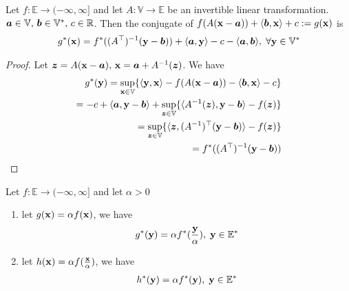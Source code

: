 \documentclass[11pt]{article}
\begin{document}
\begin{theorem}
    Let $f: \mathbb{E} \to (-\infty,\infty]$ and let $A: \mathbb{V} \to \mathbb{E}$ be an invertible 
    linear transformation. ${\bm{a}} \in \mathbb{V},\, {\bm{b}} \in \mathbb{V}^{*},\, c\in \mathbb{R}$. 
    Then the conjugate of $f(A({\mathbf{x}} - {\bm{a}})) + \langle {\bm{b}}, {\mathbf{x}} \rangle + c := g({\mathbf{x}})$ is 
    \begin{align*}
        g^{*}({\mathbf{x}}) = f^{*}((A^{\top})^{-1}({\mathbf{y}} - {\bm{b}})) + \langle {\bm{a}}, {\mathbf{y}} \rangle - c - \langle {\bm{a}}, {\bm{b}} \rangle,
        \; \forall {\mathbf{y}} \in \mathbb{V}^{*}
    \end{align*}
\end{theorem}
\begin{proof}
    Let ${\bm{z}} = A({\mathbf{x}} - {\bm{a}}), \, {\mathbf{x}} = {\bm{a}} + A^{-1}({\bm{z}})$. We have 
    \begin{align*}
        g^{*}({\mathbf{y}}) = \sup_{{\mathbf{x}} \in \mathbb{V}}\{ \langle {\mathbf{y}},{\mathbf{x}} \rangle - f(A({\mathbf{x}} - {\bm{a}})) - 
        \langle {\bm{b}}, {\mathbf{x}} \rangle - c \} \\
        = -c + \langle {\bm{a}}, {\mathbf{y}} - {\bm{b}} \rangle + 
            \sup_{{\bm{z}} \in \mathbb{V}}\{ \langle A^{-1}({\bm{z}}), {\mathbf{y}} - {\bm{b}} \rangle - f({\bm{z}}) \}\\
        = \sup_{{\bm{z}} \in \mathbb{V}}\{ \langle {\bm{z}}, (A^{-1})^{\top}({\mathbf{y}} - {\bm{b}}) \rangle - f({\bm{z}}) \}\\
        = f^{*}((A^{\top})^{-1}({\mathbf{y}} - {\bm{b}}))
    \end{align*}
\end{proof}

\begin{theorem}
    Let $f: \mathbb{E} \to (-\infty,\infty]$ and let $\alpha > 0$
    \begin{enumerate}
        \item let $g({\mathbf{x}}) = \alpha f({\mathbf{x}})$, we have 
        \begin{align*}
            g^{*}({\mathbf{y}}) = \alpha f^{*}(\frac{{\mathbf{y}}}{\alpha}), \; {\mathbf{y}} \in \mathbb{E}^{*}
        \end{align*}
        \item let $h({\mathbf{x}}) = \alpha f(\frac{{\mathbf{x}}}{\alpha})$, we have 
        \begin{align*}
            h^{*}({\mathbf{y}}) = \alpha f^{*}({\mathbf{y}}), \; {\mathbf{y}} \in \mathbb{E}^{*}
        \end{align*}
    \end{enumerate}
\end{theorem}
\end{document}
